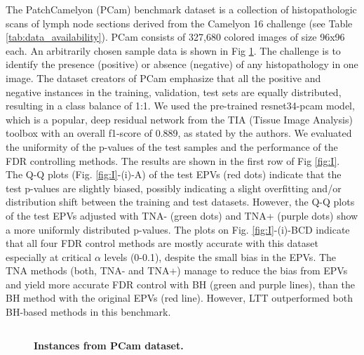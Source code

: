 \documentclass[10pt,letterpaper]{article}
\begin{document}
The PatchCamelyon (PCam) benchmark dataset is a collection of histopathologic scans of lymph node sections \cite{Veeling2018-qh} derived from the Camelyon 16 challenge \cite{camelyon16} (see Table \ref{tab:data_availability}).
PCam consists of 327,680 colored images of size 96x96 each.
An arbitrarily chosen sample data is shown in Fig \ref{fig:pcam_example}.
The challenge is to identify the presence (positive) or absence (negative) of any histopathology in one image.
The dataset creators of PCam emphasize that all the positive and negative instances in the training, validation, test sets are equally distributed, resulting in a class balance of 1:1.
We used the pre-trained resnet34-pcam model, which is a popular, deep residual network from the TIA (Tissue Image Analysis) toolbox \cite{Pocock2022} with an overall f1-score of 0.889, as stated by the authors.
We evaluated the uniformity of the p-values of the test samples and the performance of the FDR controlling methods.
The results are shown in the first row of Fig \ref{fig:I}.
The Q-Q plots (Fig. \ref{fig:I}-(i)-A) of the test EPVs (red dots) indicate that the test p-values are slightly biased, possibly indicating a slight overfitting and/or distribution shift between the training and test datasets.
However, the Q-Q plots of the test  EPVs adjusted with TNA- (green dots) and TNA+ (purple dots) show a more uniformly distributed p-values.
The plots on Fig. \ref{fig:I}-(i)-BCD indicate that all four FDR control methods are mostly accurate with this dataset especially at critical $\alpha$ levels (0-0.1), despite the small bias in the EPVs.
The TNA methods (both, TNA- and TNA+) manage to reduce the bias from EPVs and yield more accurate FDR control with BH (green and purple lines), than the BH method with the original EPVs (red line).
However, LTT outperformed both BH-based methods in this benchmark. 


\begin{figure}[h!]
	\centering
	\begin{tabular}{cccc}
	\end{tabular}
	\caption{{\bf Instances from PCam dataset.}}
	\label{fig:pcam_example}
\end{figure} 
 
\end{document}

